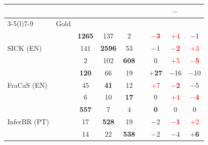 \begin{tabular}{@{}ll ccc c ccc@{}}
\toprule
 & & \multicolumn{3}{c}{\cls{}} & & \multicolumn{3}{c}{\model{} $-$ \cls{}} \\
\cmidrule(lr){3-5}\cmidrule(l){7-9}
 & Gold & \E{} & \N{} & \C{} & & \E{} & \N{} & \C{} \\
\midrule
\multirow{3}{*}{SICK (EN)} & \E{} & \textbf{1265} & 137 & 2 &  & \textcolor{red}{\textbf{$-$3}} & \textcolor{red}{$+$4} & $-$1 \\
 & \N{} & 141 & \textbf{2596} & 53 &  & $-$1 & \textcolor{red}{\textbf{$-$2}} & \textcolor{red}{$+$3} \\
 & \C{} & 2 & 102 & \textbf{608} &  & 0 & \textcolor{red}{$+$5} & \textcolor{red}{\textbf{$-$5}} \\
\midrule
\multirow{3}{*}{FraCaS (EN)} & \E{} & \textbf{120} & 66 & 19 &  & \textbf{$+$27} & $-$16 & $-$10 \\
 & \N{} & 45 & \textbf{41} & 12 &  & \textcolor{red}{$+$7} & \textcolor{red}{\textbf{$-$2}} & $-$5 \\
 & \C{} & 6 & 10 & \textbf{17} &  & 0 & \textcolor{red}{$+$4} & \textcolor{red}{\textbf{$-$4}} \\
\midrule
\multirow{3}{*}{InferBR (PT)} & \E{} & \textbf{557} & 7 & 4 &  & \textbf{0} & 0 & 0 \\
 & \N{} & 17 & \textbf{528} & 19 &  & $-$2 & \textcolor{red}{\textbf{$-$1}} & \textcolor{red}{$+$2} \\
 & \C{} & 14 & 22 & \textbf{538} &  & $-$2 & $-$4 & \textbf{$+$6} \\
\bottomrule
\end{tabular}
